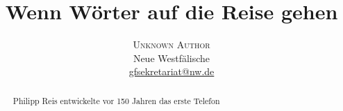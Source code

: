 \documentclass[twoside]{article}
\title{\vspace{-15mm}\fontsize{24pt}{10pt}\selectfont\textbf{Wenn W\"orter auf die Reise gehen}} %
\author{
\large
\textsc{Unknown Author}\\[2mm] %
\normalsize Neue Westf\"alische \\ %
\normalsize \href{mailto:gfsekretariat@nw.de}{gfsekretariat@nw.de} %
\vspace{-5mm}
}
\date{}
\begin{document}
\maketitle %

\thispagestyle{fancy} %


\begin{abstract}

\begin{center}
\noindent Philipp Reis entwickelte vor 150 Jahren das erste Telefon
\end{center}

\end{abstract}

\end{document}
